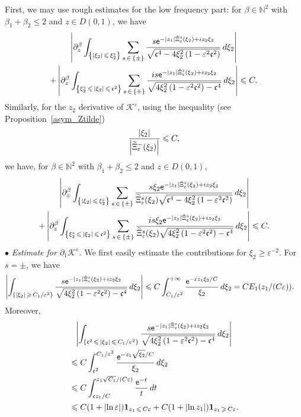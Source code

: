 \documentclass[AHL,Unicode,longabstracts,published]{cedram}
\newcommand*\p{\partial}
\newcommand*\N{\mathbb N}
\newcommand*\BK{\mathcal{K}}
\newcommand{\bfun}{\mathbf{1}}
\newcommand*\ex{{\sf e}}
\newcommand*\cs{{\mathfrak c}}
\newcommand*\ii{\infty}
\newcommand*\gs{\geqslant }
\newcommand*\ls{\leqslant }
\newcommand*\e{\varepsilon}
\renewcommand*\t{\tilde}
\let\oldtilde\tilde
\renewcommand*{\tilde}[1]{\mathchoice{\widetilde{#1}}{\widetilde{#1}}{\oldtilde{#1}}{\oldtilde{#1}}}
\begin{document}
First, we may use rough estimates for the low frequency part: for $\beta \in \N^2 $ with $ \beta_1 + \beta_2 \ls 2 $ and $ z \in D(0,1) $, we have
\begin{multline*}
 \left\lvert \p^\beta_z \int_{\left\{ |\xi_2 |\,\ls\,\xi_2^\e\right\} } \sum_{s\,\in\,\{ \pm \} }
\frac{ s \ex^{- |z_1| \t\Xi_\e^s (\xi_2) + i z_2 \xi_2} }{ \sqrt{ \cs^4 - 4 \xi_2^2 \left(1 - \e^2 \cs^2\right) } } \, d\xi_2
\right\rvert\\
+\left\lvert \p^\beta_z \int_{\left\{ \xi_2^\e \,\ls\,|\xi_2 |\,\ls\,\cs^2\right\} } \sum_{s\, \in\,\{ \pm \} } \frac{ i s \ex^{- |z_1| \t\Xi_\e^s (\xi_2) + i z_2 \xi_2} }{
\sqrt{ 4 \xi_2^2 \left(1 - \e^2 \cs^2\right) - \cs^4 } } \, d\xi_2 \right\rvert
\ls C.
\end{multline*}
Similarly, for the $ z_2 $ derivative of $ \BK^\e $, using the inequality (see Proposition~\ref{asym_Ztilde})
\[
\frac{\lvert \xi_2 \rvert}{ \left\lvert \t\Xi_\e^- (\xi_2) \right\rvert } \ls C,
\]
we have, for $ \beta \in \N^2 $ with $ \beta_1 + \beta_2 \ls 2 $ and $ z \in D(0,1) $,
\begin{multline*}
 \left\lvert \p^\beta_z \int_{\left\{ |\xi_2 | \,\ls\,\xi_2^\e \right\} } \sum_{s\,\in\,\{ \pm \} }
\frac{ s \xi_2 \ex^{- |z_1| \t\Xi_\e^s (\xi_2) + i z_2 \xi_2} }{ \t\Xi_\e^s (\xi_2) \sqrt{ \cs^4 - 4 \xi_2^2 \left(1 - \e^2 \cs^2\right) } } \, d\xi_2
\right\rvert\\
+
\left\lvert \p^\beta_z \int_{\left\{ \xi_2^\e \,\ls\,|\xi_2 |\,\ls\,\cs^2 \right\} } \sum_{s\,\in\,\{ \pm \} } \frac{ i s \xi_2 \ex^{- |z_1| \t\Xi_\e^s (\xi_2) + i z_2 \xi_2} }{
\t\Xi_\e^s (\xi_2) \sqrt{ 4 \xi_2^2 \left(1 - \e^2 \cs^2\right) - \cs^4 } } \, d\xi_2 \right\rvert
\ls C.
\end{multline*}
$ \bullet $ \emph{Estimate for $ \p_1 \BK^\e $.} We first easily estimate the contributions for $ \xi_2 \gs \e^{-2} $. For $ s = \pm $, we have
\begin{align*}
\left\lvert \int_{\left\{ |\xi_2 |\, \gs\,C_1 / \e^{2} \right\} } \frac{ s \ex^{- |z_1| \t\Xi_\e^s (\xi_2) + i z_2 \xi_2} }{
\sqrt{ 4 \xi_2^2 \left(1 - \e^2 \cs^2\right) - \cs^4 } } \, d\xi_2 \right\rvert & \ls C \int_{C_1/\e^{2}}^{+\ii } \frac{ \ex^{- \e z_1 \xi_2 / C } }{ \xi_2} \, d\xi_2 = C E_1 (z_1/ (C \e)).
\end{align*}
Moreover,
\begin{multline*}
\left\lvert \int_{\left\{ \cs^2\,\ls\,|\xi_2 | \,\ls\,C_1 / \e^{2} \right\} } \frac{ s \ex^{- |z_1| \t\Xi_\e^s (\xi_2) + i z_2 \xi_2} }{
\sqrt{ 4 \xi_2^2 \left(1 - \e^2 \cs^2\right) - \cs^4 } } \, d\xi_2 \right\rvert\\
\begin{aligned}
& \ls C \int_{\cs^2}^{C_1 / \e^{2}} \frac{ \ex^{- z_1 \sqrt{ \xi_2}/C } }{ \xi_2} \, d\xi_2
\\ & \ls C \int_{\cs z_1/C }^{z_1 \sqrt{C_1} / (C \e) } \frac{ \ex^{- t} }{ t } \, dt
\\ & \ls C (1+ \lvert \ln \e \rvert) \bfun_{z_1\,\ls\,C \e} + C (1+ \lvert \ln z_1 \rvert) \bfun_{z_1\,\gs\,C \e}.
\end{aligned}
\end{multline*}
\end{document}
